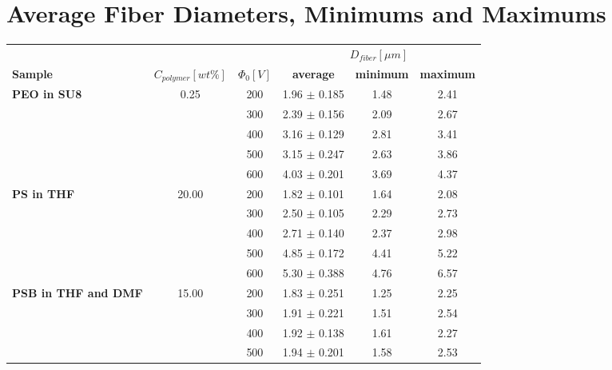 
\chapter{Average Fiber Diameters, Minimums and Maximums} %

\label{Appendix_FiberDiameters} %

\begin{table}[!th]
\centering
\caption[Average Fiber Diameter for All the Experiments]{Average Fiber Diameter for All the Experiments}
\begin{xltabular}{\textwidth}{Xccccc}
\hline
{} & {} & {} &  \\
\textbf{Sample} & \textbf{$C_{polymer} [wt\%]$} & \textbf{$\Phi_0 [V]$} & \textbf{average} & \textbf{minimum} & \textbf{maximum} \\
\hline
\textbf{PEO in SU8}         & 0.25  & 200 & 1.96 $\pm$ 0.185 & 1.48 & 2.41 \\
{}                          & {}    & 300 & 2.39 $\pm$ 0.156 & 2.09 & 2.67 \\
{}                          & {}    & 400 & 3.16 $\pm$ 0.129 & 2.81 & 3.41 \\
{}                          & {}    & 500 & 3.15 $\pm$ 0.247 & 2.63 & 3.86 \\
{}                          & {}    & 600 & 4.03 $\pm$ 0.201 & 3.69 & 4.37 \\
\textbf{PS in THF}          & 20.00 & 200 & 1.82 $\pm$ 0.101 & 1.64 & 2.08 \\
{}                          & {}    & 300 & 2.50 $\pm$ 0.105 & 2.29 & 2.73 \\
{}                          & {}    & 400 & 2.71 $\pm$ 0.140 & 2.37 & 2.98 \\
{}                          & {}    & 500 & 4.85 $\pm$ 0.172 & 4.41 & 5.22 \\
{}                          & {}    & 600 & 5.30 $\pm$ 0.388 & 4.76 & 6.57 \\
\textbf{PSB in THF and DMF} & 15.00 & 200 & 1.83 $\pm$ 0.251 & 1.25 & 2.25 \\
{}                          & {}    & 300 & 1.91 $\pm$ 0.221 & 1.51 & 2.54 \\
{}                          & {}    & 400 & 1.92 $\pm$ 0.138 & 1.61 & 2.27 \\
{}                          & {}    & 500 & 1.94 $\pm$ 0.201 & 1.58 & 2.53 \\

\end{xltabular}
\end{table}
